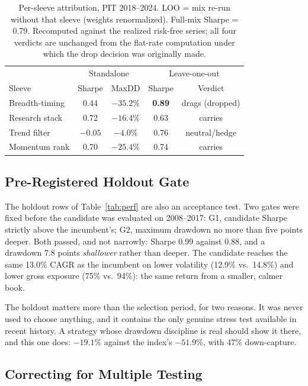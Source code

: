 \documentclass[10pt,twocolumn]{IEEEtran}
\begin{document}
\begin{table}[t]
\caption{Per-sleeve attribution, PIT 2018--2024. LOO = mix re-run without
that sleeve (weights renormalized). Full-mix Sharpe = 0.79. Recomputed against
the realized risk-free series; all four verdicts are unchanged from the
flat-rate computation under which the drop decision was originally made.}
\label{tab:loo}
\centering
\begin{tabular}{lcccc}
\toprule
& \multicolumn{2}{c}{Standalone} & \multicolumn{2}{c}{Leave-one-out} \\
Sleeve & Sharpe & MaxDD & Sharpe & Verdict \\
\midrule
Breadth-timing & 0.44 & $-35.2\%$ & \textbf{0.89} & drags (dropped) \\
Research stack & 0.72 & $-16.4\%$ & 0.63 & carries \\
Trend filter & $-0.05$ & $-4.0\%$ & 0.76 & neutral/hedge \\
Momentum rank & 0.70 & $-25.4\%$ & 0.74 & carries \\
\bottomrule
\end{tabular}
\end{table}

\subsection{Pre-Registered Holdout Gate}

The holdout rows of Table~\ref{tab:perf} are also an acceptance test. Two gates
were fixed before the candidate was evaluated on 2008--2017: G1, candidate
Sharpe strictly above the incumbent's; G2, maximum drawdown no more than five
points deeper. Both passed, and not narrowly: Sharpe 0.99 against 0.88, and a
drawdown 7.8 points \emph{shallower} rather than deeper. The candidate reaches
the same 13.0\% CAGR as the incumbent on lower volatility (12.9\% vs.\ 14.8\%)
and lower gross exposure (75\% vs.\ 94\%): the same return from a smaller,
calmer book.

The holdout matters more than the selection period, for two reasons. It was
never used to choose anything, and it contains the only genuine stress test
available in recent history. A strategy whose drawdown discipline is real
should show it there, and this one does: $-19.1\%$ against the index's
$-51.9\%$, with 47\% down-capture.

\subsection{Correcting for Multiple Testing}
\label{sec:dsr}
\end{document}
